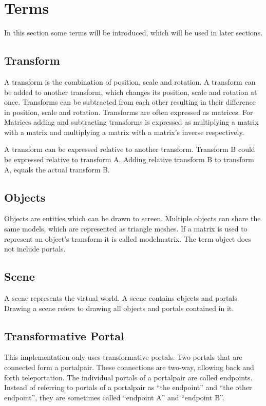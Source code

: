 \section{Terms}
In this section some terms will be introduced, which will be used in later sections.

\subsection{Transform}
A transform is the combination of position, scale and rotation. A transform can be added to another transform, which changes its position, scale and rotation at once. Transforms can be subtracted from each other resulting in their difference in position, scale and rotation. Transforms are often expressed as matrices. For Matrices adding and subtracting transforms is expressed as multiplying a matrix with a matrix and multiplying a matrix with a matrix's inverse respectively.

A transform can be expressed relative to another transform. Transform B could be expressed relative to transform A. Adding relative transform B to transform A, equals the actual transform B.


\subsection{Objects}
Objects are entities which can be drawn to screen. Multiple objects can share the same models, which are represented as triangle meshes. If a matrix is used to represent an object's transform it is called \gls{modelmatrix}. The term object does not include portals.

\subsection{Scene}
A scene represents the virtual world. A scene contains objects and portals. Drawing a scene refers to drawing all objects and portals contained in it.



\subsection{Transformative Portal}
This implementation only uses transformative portals. Two portals that are connected form a \gls{portalpair}. These connections are two-way, allowing back and forth teleportation. The individual portals of a \gls{portalpair} are called \glspl{endpoint}. Instead of referring to portals of a \gls{portalpair} as \enquote{the \gls{endpoint}} and \enquote{the other \gls{endpoint}}, they are sometimes called \enquote{\gls{endpoint} A} and \enquote{\gls{endpoint} B}.

